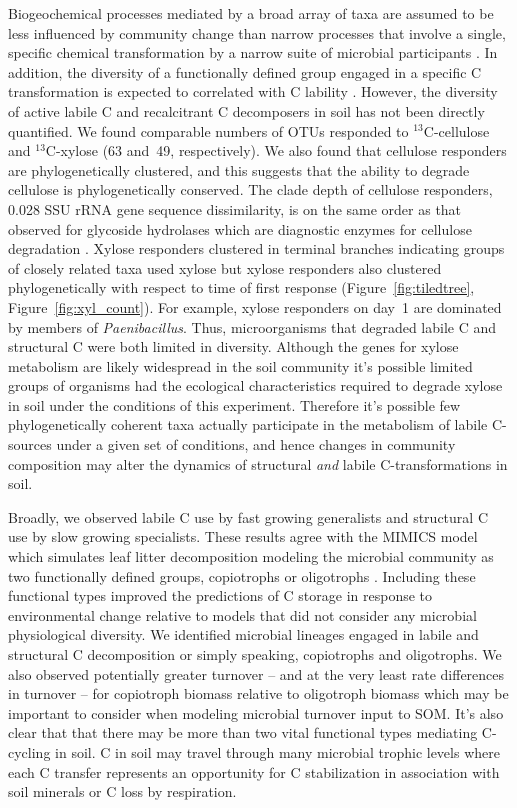 Biogeochemical processes mediated by a broad array of taxa are assumed to
be less influenced by community change than narrow processes that involve
a single, specific chemical transformation by a narrow suite of microbial
participants \citep{Schimel_1995,McGuire2010}. In addition, the diversity of
a functionally defined group engaged in a specific C transformation is expected
to correlated with C lability \citep{McGuire2010}. However, the diversity of
active labile C and recalcitrant C decomposers in soil has not been directly
quantified. We found comparable numbers of OTUs responded to $^{13}$C-cellulose
and $^{13}$C-xylose (63 and~49, respectively). We also found that cellulose
responders are phylogenetically clustered, and this suggests that the ability
to degrade cellulose is phylogenetically conserved. The clade depth of
cellulose responders, 0.028 SSU rRNA gene sequence dissimilarity, is on the
same order as that observed for glycoside hydrolases which are diagnostic
enzymes for cellulose degradation \citep{Berlemont2013}. Xylose responders
clustered in terminal branches indicating groups of closely related taxa used
xylose but xylose responders also clustered phylogenetically with respect to
time of first response (Figure~\ref{fig:tiledtree},
Figure~\ref{fig:xyl_count}). For example, xylose responders on day~1 are
dominated by members of \textit{Paenibacillus}. Thus, microorganisms that
degraded labile C and structural C were both limited in diversity. Although the
genes for xylose metabolism are likely widespread in the soil
community it's possible limited groups of organisms had the ecological
characteristics required to degrade xylose in soil under the
conditions of this experiment. Therefore it's possible few phylogenetically
coherent taxa actually participate in the metabolism of labile 
C-sources under a given set of conditions, and hence changes in community
composition may alter the dynamics of structural \textit{and} labile
C-transformations in soil.

Broadly, we observed labile C use by fast growing generalists and structural
C use by slow growing specialists. These results agree with the MIMICS model
which simulates leaf litter decomposition modeling the microbial community as
two functionally defined groups, copiotrophs or oligotrophs
\citep{wieder_2014a}. Including these functional types improved the predictions
of C storage in response to environmental change relative to models that did
not consider any microbial physiological diversity. We identified
microbial lineages engaged in labile and structural C decomposition or simply
speaking, copiotrophs and oligotrophs. We also observed potentially greater
turnover -- and at the very least rate differences in turnover -- for
copiotroph biomass relative to oligotroph biomass which may be important to
consider when modeling microbial turnover input to SOM. It's also clear that
that there may be more than two vital functional types mediating C-cycling in
soil. C in soil may travel through many microbial trophic levels where each
C transfer represents an opportunity for C stabilization in association with
soil minerals or C loss by respiration.

